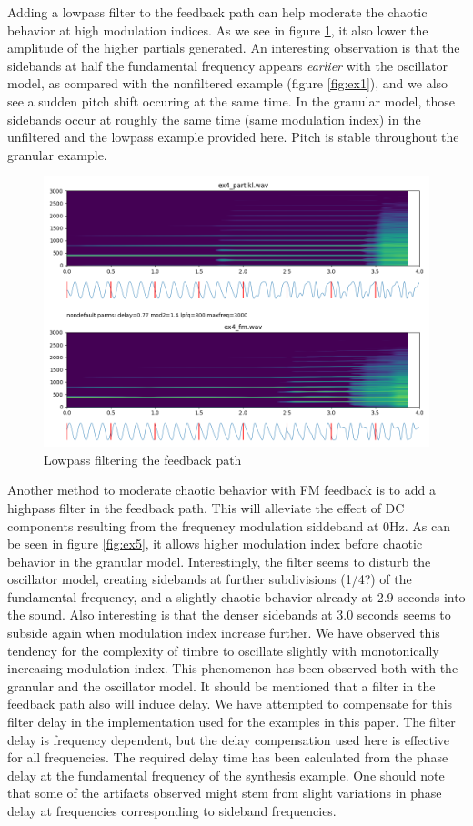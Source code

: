 \documentclass[runningheads,a4paper]{llncs}
\begin{document}
Adding a lowpass filter to the feedback path can help moderate the chaotic behavior at high modulation indices. As we see in figure \ref{fig:ex4}, it also lower the amplitude of the higher partials generated. An interesting observation is that the sidebands at half the fundamental frequency appears \emph{earlier} with the oscillator model, as compared with the nonfiltered example (figure \ref{fig:ex1}), and we also see a sudden pitch shift occuring at the same time. In the granular model, those sidebands occur at roughly the same time (same modulation index) in the unfiltered and the lowpass example provided here. Pitch is stable throughout the granular example.

\begin{figure}
	\centering
	\includegraphics[width=.95\textwidth]{ex4_compare.png}
	\caption{Lowpass filtering the feedback path}
	\label{fig:ex4}
\end{figure}

Another method to moderate chaotic behavior with FM feedback is to add a highpass filter in the feedback path. This will alleviate the effect of DC components resulting from the frequency modulation siddeband at 0Hz.  As can be seen in figure \ref{fig:ex5},  it allows higher modulation index before chaotic behavior in the granular model. Interestingly, the filter seems to disturb the oscillator model, creating sidebands at further subdivisions (1/4?) of the fundamental frequency, and a slightly chaotic behavior already at 2.9 seconds into the sound. Also interesting is that the denser sidebands at 3.0 seconds seems to subside again when modulation index increase further. We have observed this tendency for the complexity of timbre to oscillate slightly with monotonically increasing modulation index. This phenomenon has been observed both with the granular and the oscillator model. It should be mentioned that a filter in the feedback path also will induce delay. We have attempted to compensate for this filter delay in the implementation used for the examples in this paper. The filter delay is frequency dependent, but the delay compensation used here is effective for all frequencies. The required delay time has been calculated from the phase delay at the fundamental frequency of the synthesis example. One should note that some of the artifacts observed might stem from slight variations in phase delay at frequencies corresponding to sideband frequencies.
\end{document}
